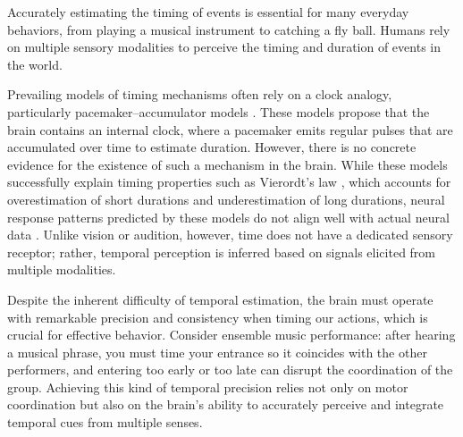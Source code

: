 \documentclass[9pt,lineno,doublespacing]{elife}
\begin{document}
Accurately estimating the timing of events is essential for many everyday behaviors, from playing a musical instrument to catching a fly ball. Humans rely on multiple sensory modalities to perceive the timing and duration of events in the world. 

Prevailing models of timing mechanisms often rely on a clock analogy, particularly pacemaker–accumulator models \citep{treisman1963temporal,gibbon1977scalar,wittmann2009inner,grondin2014non,hartcher2016single,grondin2025perception}. These models propose that the brain contains an internal clock, where a pacemaker emits regular pulses that are accumulated over time to estimate duration. However, there is no concrete evidence for the existence of such a mechanism in the brain. While these models successfully explain timing properties such as Vierordt's law \citep{lejeune2009vierordt,jazayeri2010temporal,mamassian2010s}, which accounts for overestimation of short durations and underestimation of long durations, neural response patterns predicted by these models do not align well with actual neural data \citep{buonomano2010population,muller2014perceiving,kononowicz2016search}. 
Unlike vision or audition, however, time does not have a dedicated sensory receptor; rather, temporal perception is inferred based on signals elicited from multiple modalities.

Despite the inherent difficulty of temporal estimation, the brain must operate with remarkable precision and consistency when timing our actions, which is crucial for effective behavior. Consider ensemble music performance: after hearing a musical phrase, you must time your entrance so it coincides with the other performers, and entering too early or too late can disrupt the coordination of the group. Achieving this kind of temporal precision relies not only on motor coordination but also on the brain’s ability to accurately perceive and integrate temporal cues from multiple senses.
\end{document}
